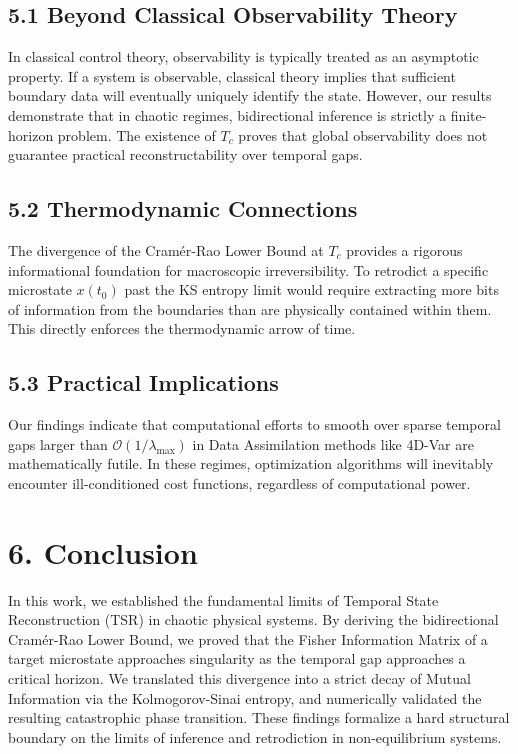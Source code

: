 \documentclass[aps,prl,reprint,superscriptaddress,nofootinbib]{revtex4-2}
\begin{document}
\subsection{5.1 Beyond Classical Observability Theory}
In classical control theory, observability is typically treated as an asymptotic property. If a system is observable, classical theory implies that sufficient boundary data will eventually uniquely identify the state. However, our results demonstrate that in chaotic regimes, bidirectional inference is strictly a finite-horizon problem. The existence of $T_c$ proves that global observability does not guarantee practical reconstructability over temporal gaps. 

\subsection{5.2 Thermodynamic Connections}
The divergence of the Cram\'{e}r-Rao Lower Bound at $T_c$ provides a rigorous informational foundation for macroscopic irreversibility. To retrodict a specific microstate $x(t_0)$ past the KS entropy limit would require extracting more bits of information from the boundaries than are physically contained within them. This directly enforces the thermodynamic arrow of time.

\subsection{5.3 Practical Implications}
Our findings indicate that computational efforts to smooth over sparse temporal gaps larger than $\mathcal{O}(1/\lambda_{\max})$ in Data Assimilation methods like 4D-Var are mathematically futile. In these regimes, optimization algorithms will inevitably encounter ill-conditioned cost functions, regardless of computational power.

\section{6. Conclusion}
In this work, we established the fundamental limits of Temporal State Reconstruction (TSR) in chaotic physical systems. By deriving the bidirectional Cram\'{e}r-Rao Lower Bound, we proved that the Fisher Information Matrix of a target microstate approaches singularity as the temporal gap approaches a critical horizon. We translated this divergence into a strict decay of Mutual Information via the Kolmogorov-Sinai entropy, and numerically validated the resulting catastrophic phase transition. These findings formalize a hard structural boundary on the limits of inference and retrodiction in non-equilibrium systems.
\end{document}
